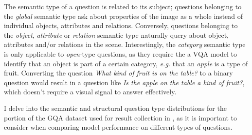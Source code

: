 The semantic type of a question is related to its subject; questions belonging to the \textit{global} semantic type ask about properties of the image as a whole instead of individual objects, attributes and relations. Conversely, questions belonging to the \textit{object}, \textit{attribute} or \textit{relation} semantic type naturally query about object, attributes and/or relations in the scene. Interestingly, the \textit{category} semantic type is only applicable to \textit{open}-type questions, as they require the a VQA model to identify that an object is part of a certain category, \textit{e.g.} that an \textit{apple} is a type of fruit. Converting the question \textit{What kind of fruit is on the table?} to a binary question would result in a question like \textit{Is the apple on the table a kind of fruit?}, which doesn't require a visual signal to answer effectively.

I delve into the semantic and structural question type distributions for the portion of the GQA dataset used for result collection in \sectionautorefname{ \ref{sec:ablation_studies}}, as it is important to consider when comparing model performance on different types of questions.




